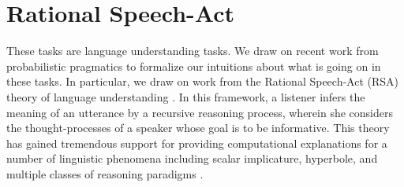 \documentclass[10pt,letterpaper]{article}
\begin{document}
%
%



\section{Rational Speech-Act}


These tasks are language understanding tasks. We draw on recent work from probabilistic pragmatics to formalize our intuitions about what is going on in these tasks. In particular, we draw on work from the Rational Speech-Act (RSA) theory of language understanding \cite{Frank2012}. In this framework, a listener infers the meaning of an utterance by a recursive reasoning process, wherein she considers the thought-processes of a speaker whose goal is to be informative. This theory has gained tremendous support for providing computational explanations for a number of linguistic phenomena including scalar implicature, hyperbole, and multiple classes of reasoning paradigms \cite{Goodman2013, Kao2014, Tessler2014, Lassiter2014}. 
\end{document}
